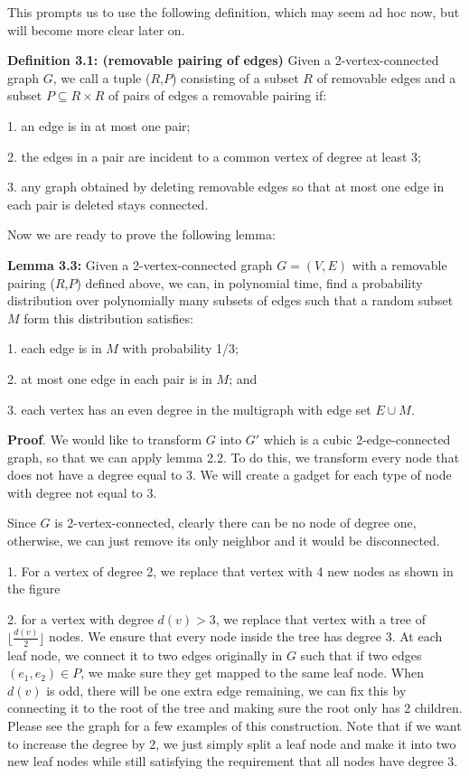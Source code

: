 \documentclass[12pt]{article}
\begin{document}
This prompts us to use the following definition, which may seem ad hoc now, but will become more clear later on.

{\bf Definition 3.1: (removable pairing of edges)}
Given a 2-vertex-connected graph $G$, we call a tuple ($R$,$P$) consisting of a subset $R$ of removable edges and a subset $P \subseteq R \times R$ of pairs of edges a removable pairing if:

1. an edge is in at most one pair;

2. the edges in a pair are incident to a common vertex of degree at least 3;

3. any graph obtained by deleting removable edges so that at most one edge in each pair is deleted stays connected.

Now we are ready to prove the following lemma:

{\bf Lemma 3.3:} Given a 2-vertex-connected graph $G=(V,E)$ with a removable pairing ($R$,$P$) defined above, we can, in polynomial time, find a probability distribution over polynomially many subsets of edges such that a random subset $M$ form this distribution satisfies:

1. each edge is in $M$ with probability 1/3;

2. at most one edge in each pair is in $M$; and

3. each vertex has an even degree in the multigraph with edge set $E \cup M$.

{\bf Proof}. We would like to transform $G$ into $G'$ which is a cubic 2-edge-connected graph, so that we can apply lemma 2.2. To do this, we transform every node that does not have a degree equal to 3. We will create a gadget for each type of node with degree not equal to 3.

Since $G$ is 2-vertex-connected, clearly there can be no node of degree one, otherwise, we can just remove its only neighbor and it would be disconnected.

1. For a vertex of degree 2, we replace that vertex with 4 new nodes as shown in the figure

2. for a vertex with degree $d(v)>3$, we replace that vertex with a tree of $\lfloor \frac{d(v)}{2} \rfloor$ nodes. We ensure that every node inside the tree has degree 3. At each leaf node, we connect it to two edges originally in $G$ such that if two edges $(e_1,e_2)\in P$, we make sure they get mapped to the same leaf node. When $d(v)$ is odd, there will be one extra edge remaining, we can fix this by connecting it to the root of the tree and making sure the root only has 2 children. Please see the graph for a few examples of this construction. Note that if we want to increase the degree by 2, we just simply split a leaf node and make it into two new leaf nodes while still satisfying the requirement that all nodes have degree 3.
\end{document}
